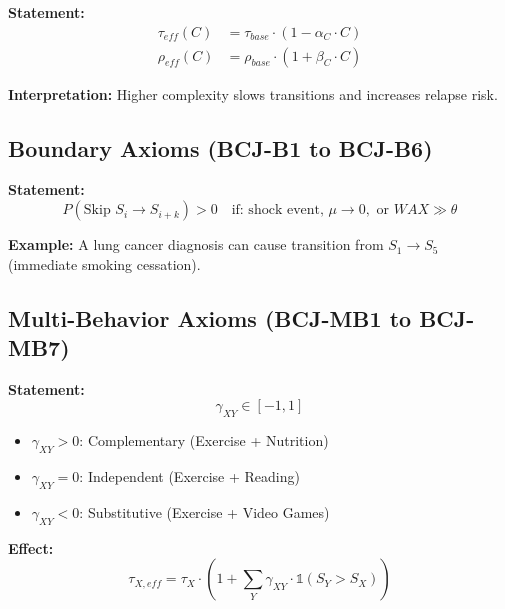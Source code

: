 \begin{tcolorbox}[colback=gray!5!white, colframe=gray!75!black,
    title=Axiom BCJ-C5: Complexity-Dynamics Interaction]
\textbf{Statement:}
\begin{align}
\tau_{eff}(C) &= \tau_{base} \cdot (1 - \alpha_C \cdot C) \\
\rho_{eff}(C) &= \rho_{base} \cdot (1 + \beta_C \cdot C)
\end{align}

\textbf{Interpretation:} Higher complexity slows transitions and increases relapse risk.
\end{tcolorbox}

\subsection{Boundary Axioms (BCJ-B1 to BCJ-B6)}

\begin{tcolorbox}[colback=gray!5!white, colframe=gray!75!black,
    title=Axiom BCJ-B4: Stage Skipping]
\textbf{Statement:}
\begin{equation}
P(\text{Skip } S_i \to S_{i+k}) > 0 \quad \text{if: shock event, } \mu \to 0, \text{ or } WAX \gg \theta
\end{equation}

\textbf{Example:} A lung cancer diagnosis can cause transition from $S_1 \to S_5$ (immediate smoking cessation).
\end{tcolorbox}

\subsection{Multi-Behavior Axioms (BCJ-MB1 to BCJ-MB7)}

\begin{tcolorbox}[colback=gray!5!white, colframe=gray!75!black,
    title=Axiom BCJ-MB4: Behavior Complementarity]
\textbf{Statement:}
\begin{equation}
\gamma_{XY} \in [-1, 1]
\end{equation}

\begin{itemize}[nosep]
\item $\gamma_{XY} > 0$: Complementary (Exercise + Nutrition)
\item $\gamma_{XY} = 0$: Independent (Exercise + Reading)
\item $\gamma_{XY} < 0$: Substitutive (Exercise + Video Games)
\end{itemize}

\textbf{Effect:}
\begin{equation}
\tau_{X,eff} = \tau_X \cdot \left(1 + \sum_Y \gamma_{XY} \cdot \mathbb{1}(S_Y > S_X)\right)
\end{equation}
\end{tcolorbox}

